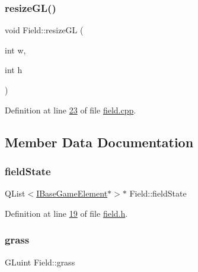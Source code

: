 \mbox{\label{a00173_a4122f1e70a73ec6c580029d968e4553c}} 
\subsubsection{\texorpdfstring{resize\+G\+L()}{resizeGL()}}
{\footnotesize\ttfamily void Field\+::resize\+GL (\begin{DoxyParamCaption}\item[{int}]{w,  }\item[{int}]{h }\end{DoxyParamCaption})\hspace{0.3cm}{\ttfamily [protected]}}



Definition at line \hyperlink{a00071_source_l00023}{23} of file \hyperlink{a00071_source}{field.\+cpp}.



\subsection{Member Data Documentation}
\mbox{\label{a00173_a7cd047782edbf1436174dfc2aeea1bdc}} 
\subsubsection{\texorpdfstring{field\+State}{fieldState}}
{\footnotesize\ttfamily Q\+List$<$\hyperlink{a00137}{I\+Base\+Game\+Element}$\ast$$>$$\ast$ Field\+::field\+State\hspace{0.3cm}{\ttfamily [protected]}}



Definition at line \hyperlink{a00074_source_l00019}{19} of file \hyperlink{a00074_source}{field.\+h}.

\mbox{\label{a00173_a4b226d02ce54a5d320cf3dc99b7b8433}} 
\subsubsection{\texorpdfstring{grass}{grass}}
{\footnotesize\ttfamily G\+Luint Field\+::grass\hspace{0.3cm}{\ttfamily [protected]}}




